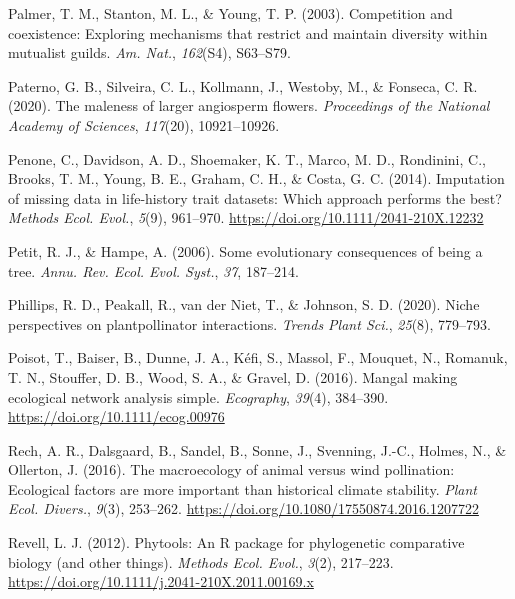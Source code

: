 \documentclass[
  12pt,
  a4paper,
]{article}
\newlength{\cslhangindent}
\newlength{\cslentryspacingunit} %
\newenvironment{CSLReferences}[2] %
 {%
  \setlength{\parindent}{0pt}
  \ifodd #1
  \let\oldpar\par
  \def\par{\hangindent=\cslhangindent\oldpar}
  \fi
  \setlength{\parskip}{#2\cslentryspacingunit}
 }%
 {}
\begin{document}
\begin{CSLReferences}{1}{0}
\leavevmode{}%
Palmer, T. M., Stanton, M. L., \& Young, T. P. (2003). Competition and coexistence: Exploring mechanisms that restrict and maintain diversity within mutualist guilds. \emph{Am. Nat.}, \emph{162}(S4), S63--S79.

\leavevmode{}%
Paterno, G. B., Silveira, C. L., Kollmann, J., Westoby, M., \& Fonseca, C. R. (2020). The maleness of larger angiosperm flowers. \emph{Proceedings of the National Academy of Sciences}, \emph{117}(20), 10921--10926.

\leavevmode{}%
Penone, C., Davidson, A. D., Shoemaker, K. T., Marco, M. D., Rondinini, C., Brooks, T. M., Young, B. E., Graham, C. H., \& Costa, G. C. (2014). Imputation of missing data in life-history trait datasets: Which approach performs the best? \emph{Methods Ecol. Evol.}, \emph{5}(9), 961--970. \url{https://doi.org/10.1111/2041-210X.12232}

\leavevmode{}%
Petit, R. J., \& Hampe, A. (2006). Some evolutionary consequences of being a tree. \emph{Annu. Rev. Ecol. Evol. Syst.}, \emph{37}, 187--214.

\leavevmode{}%
Phillips, R. D., Peakall, R., van der Niet, T., \& Johnson, S. D. (2020). Niche perspectives on plant\textendash pollinator interactions. \emph{Trends Plant Sci.}, \emph{25}(8), 779--793.

\leavevmode{}%
Poisot, T., Baiser, B., Dunne, J. A., Kéfi, S., Massol, F., Mouquet, N., Romanuk, T. N., Stouffer, D. B., Wood, S. A., \& Gravel, D. (2016). Mangal \textendash{} making ecological network analysis simple. \emph{Ecography}, \emph{39}(4), 384--390. \url{https://doi.org/10.1111/ecog.00976}

\leavevmode{}%
Rech, A. R., Dalsgaard, B., Sandel, B., Sonne, J., Svenning, J.-C., Holmes, N., \& Ollerton, J. (2016). The macroecology of animal versus wind pollination: Ecological factors are more important than historical climate stability. \emph{Plant Ecol. Divers.}, \emph{9}(3), 253--262. \url{https://doi.org/10.1080/17550874.2016.1207722}

\leavevmode{}%
Revell, L. J. (2012). Phytools: An {R} package for phylogenetic comparative biology (and other things). \emph{Methods Ecol. Evol.}, \emph{3}(2), 217--223. \url{https://doi.org/10.1111/j.2041-210X.2011.00169.x}


\end{CSLReferences}
\end{document}
